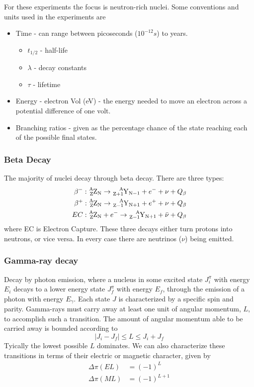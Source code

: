 For these experiments the focus is neutron-rich nuclei. Some conventions and units
used in the experiments are
\begin{itemize}
	\item Time - can range between picoseconds ($10^{-12}s$) to years.
	\begin{itemize}
		\item $t_{1/2}$ - half-life
		\item $\lambda$ - decay constants
		\item $\tau$ - lifetime
	\end{itemize}
	\item Energy - electron Vol (eV) - the energy needed to move an electron
	across a potential difference of one volt.
	\item Branching ratios - given as the percentage chance of the state reaching
	each of the possible final states.
\end{itemize}
\subsubsection{Beta Decay}
The majority of nuclei decay through beta decay. There are three types:
\begin{align}
	\beta^-: \ce{^{A}_{Z}Z_{N}} \rightarrow \ce{^{A}_{Z+1}Y_{N-1}} + e^- + \nu + Q_{\beta} \\
	\beta^+: \ce{^{A}_{Z}Z_{N}} \rightarrow \ce{^{A}_{Z-1}Y_{N+1}} + e^+ + \nu + Q_{\beta} \\
	EC: \ce{^{A}_{Z}Z_{N}} + e^- \rightarrow \ce{^{A}_{Z-1}Y_{N+1}} + \bar{\nu} + Q_{\beta}
\end{align}
where EC is Electron Capture. These three decays either turn protons into neutrons, or
vice versa. In every case there are neutrinos ($\nu$) being emitted.

\subsubsection{Gamma-ray decay}
Decay by photon emission, where a nucleus in some excited state $J_i^{\pi}$ with energy
$E_i$ decays to a lower energy state $J_f^{\pi}$ with energy $E_f$, through the emission
of a photon with energy $E_{\gamma}$. Each state $J$ is characterized by a specific spin
and parity. Gamma-rays must carry away at least one unit of angular momentum, $L$, to
accomplish such a transition. The amount of angular momentum able to be carried away is
bounded according to
\begin{equation}
	|J_i - J_f| \leq L \leq J_i + J_f
\end{equation}
Tyically the lowest possible $L$ dominates. We can also characterize these transitions
in terms of their electric or magnetic character, given by
\begin{align}
	\Delta\pi(EL) &= (-1)^L \\
	\Delta\pi(ML) &= (-1)^{L+1}
\end{align}

